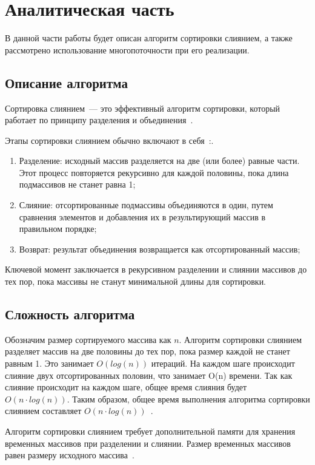 \chapter{Аналитическая часть}
В данной части работы будет описан алгоритм сортировки слиянием, 
а также рассмотрено использование многопоточности при его реализации.

\section{Описание алгоритма}
Сортировка слиянием~--- это эффективный алгоритм сортировки, который работает по принципу разделения и объединения~\cite{merge-sort}.

Этапы сортировки слиянием обычно включают в себя~\cite{merge-sort}:.
\begin{enumerate}
	\item Разделение: исходный массив разделяется на две (или более) равные части. 
	Этот процесс повторяется рекурсивно для каждой половины, пока длина подмассивов не станет равна 1;

	\item Слияние: отсортированные подмассивы объединяются в один, путем сравнения элементов и добавления их в результирующий массив в правильном порядке;

	\item Возврат: результат объединения возвращается как отсортированный массив;
\end{enumerate}
Ключевой момент заключается в рекурсивном разделении и слиянии массивов до тех пор, пока массивы не станут минимальной длины для сортировки.

\section{Сложность алгоритма}
Обозначим размер сортируемого массива как $n$. 
Алгоритм сортировки слиянием разделяет массив на две половины до тех пор, пока размер каждой  не станет равным 1. Это занимает $O(log(n))$ итераций.
На каждом шаге происходит слияние двух отсортированных половин, что занимает O(n) времени. Так как слияние происходит на каждом шаге, общее время слияния будет $O(n \cdot log(n))$.
Таким образом, общее время выполнения алгоритма сортировки слиянием составляет $O(n  \cdot log(n))$~\cite{merge-sort}.

Алгоритм сортировки слиянием требует дополнительной памяти для хранения временных массивов при разделении и слиянии. Размер временных массивов равен размеру исходного массива~\cite{merge-sort}.

